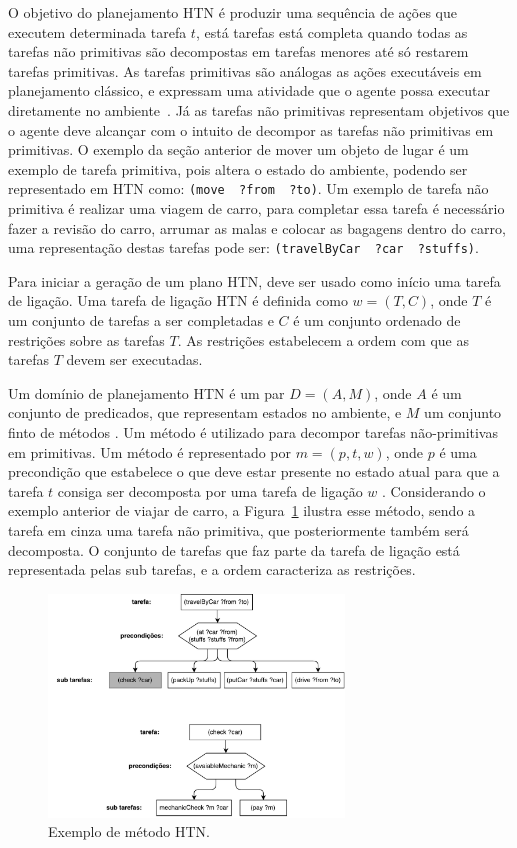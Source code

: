 O objetivo do planejamento HTN é produzir uma sequência de ações que executem determinada tarefa $t$, está tarefas está completa quando todas as tarefas não primitivas são decompostas em tarefas menores até só restarem tarefas primitivas.  
As tarefas primitivas são análogas as ações executáveis em planejamento clássico, e expressam uma atividade que o agente possa executar diretamente no ambiente~\cite[Capítulo 11]{intelligence2003modern}. 
Já as tarefas não primitivas representam objetivos que o agente deve alcançar com o intuito de decompor as tarefas não primitivas em primitivas. 
O exemplo da seção anterior de mover um objeto de lugar é um exemplo de tarefa primitiva, pois altera o estado do ambiente, podendo ser representado em HTN como: \texttt{(move~ ?from~ ?to)}. 
Um exemplo de tarefa não primitiva é realizar uma viagem de carro, para completar essa tarefa é necessário fazer a revisão do carro, arrumar as malas e colocar as bagagens dentro do carro, uma representação destas tarefas pode ser: \texttt{(travelByCar ~?car~ ?stuffs)}. 

Para iniciar a geração de um plano HTN, deve ser usado como início uma tarefa de ligação. 
Uma tarefa de ligação HTN é definida como $w = (T, C)$, onde $T$ é um conjunto de tarefas a ser completadas e $C$ é um conjunto ordenado de restrições sobre as tarefas $T$. 
As restrições estabelecem a ordem com que as tarefas $T$ devem ser executadas. 

Um domínio de planejamento HTN é um par $D = (A, M)$, onde $A$ é um conjunto de predicados, que representam estados no ambiente, e $M$ um conjunto finto de métodos \cite{meneguzzi2015planning}. 
Um método é utilizado para decompor tarefas não-primitivas em primitivas. 
Um método é representado por $m = (p, t, w)$, onde $p$ é uma precondição que estabelece o que deve estar presente no estado atual para que a tarefa $t$ consiga ser decomposta por uma tarefa de ligação $w$ \cite{ghallab2004automated}. 
Considerando o exemplo anterior de viajar de carro, a Figura~\ref{fig:htnmethod} ilustra esse método, sendo a tarefa em cinza uma tarefa não primitiva, que posteriormente também será decomposta. 
O conjunto de tarefas que faz parte da tarefa de ligação está representada pelas sub tarefas, e a ordem caracteriza as restrições. 

\begin{figure}[ht]
	\centering
	\includegraphics[width=0.7\textwidth]{fig/htnmethod.pdf}
	\caption{Exemplo de método HTN.}
	\label{fig:htnmethod}
\end{figure} 

